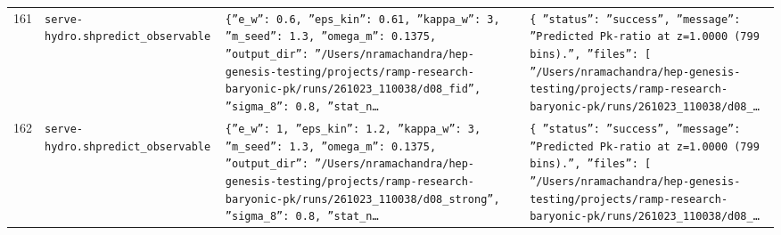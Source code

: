 \documentclass[11pt,a4paper]{article}
\begin{document}
\begin{longtable}{@{}p{}p{}p{}p{}@{}}
161 & \texttt{serve-hydro.sh}\newline\texttt{predict\_\allowbreak{}observable} & \texttt{\{''e\_\allowbreak{}w'':\allowbreak{} 0.6,\allowbreak{} ''eps\_\allowbreak{}kin'':\allowbreak{} 0.61,\allowbreak{} ''kappa\_\allowbreak{}w'':\allowbreak{} 3,\allowbreak{} ''m\_\allowbreak{}seed'':\allowbreak{} 1.3,\allowbreak{} ''omega\_\allowbreak{}m'':\allowbreak{} 0.1375,\allowbreak{} ''output\_\allowbreak{}dir'':\allowbreak{} ''/\allowbreak{}Users/\allowbreak{}nramachandra/\allowbreak{}hep-genesis-testing/\allowbreak{}projects/\allowbreak{}ramp-research-baryonic-pk/\allowbreak{}runs/\allowbreak{}261023\_\allowbreak{}110038/\allowbreak{}d08\_\allowbreak{}fid'',\allowbreak{} ''sigma\_\allowbreak{}8'':\allowbreak{} 0.8,\allowbreak{} ''stat\_\allowbreak{}n\ldots{}\allowbreak{}} & \texttt{\{   ''status'':\allowbreak{} ''success'',\allowbreak{}   ''message'':\allowbreak{} ''Predicted Pk-ratio at z=\allowbreak{}1.0000 (799 bins)\allowbreak{}.'',\allowbreak{}   ''files'':\allowbreak{} [     ''/\allowbreak{}Users/\allowbreak{}nramachandra/\allowbreak{}hep-genesis-testing/\allowbreak{}projects/\allowbreak{}ramp-research-baryonic-pk/\allowbreak{}runs/\allowbreak{}261023\_\allowbreak{}110038/\allowbreak{}d08\_\allowbreak{}\ldots{}\allowbreak{}} \\
162 & \texttt{serve-hydro.sh}\newline\texttt{predict\_\allowbreak{}observable} & \texttt{\{''e\_\allowbreak{}w'':\allowbreak{} 1,\allowbreak{} ''eps\_\allowbreak{}kin'':\allowbreak{} 1.2,\allowbreak{} ''kappa\_\allowbreak{}w'':\allowbreak{} 3,\allowbreak{} ''m\_\allowbreak{}seed'':\allowbreak{} 1.3,\allowbreak{} ''omega\_\allowbreak{}m'':\allowbreak{} 0.1375,\allowbreak{} ''output\_\allowbreak{}dir'':\allowbreak{} ''/\allowbreak{}Users/\allowbreak{}nramachandra/\allowbreak{}hep-genesis-testing/\allowbreak{}projects/\allowbreak{}ramp-research-baryonic-pk/\allowbreak{}runs/\allowbreak{}261023\_\allowbreak{}110038/\allowbreak{}d08\_\allowbreak{}strong'',\allowbreak{} ''sigma\_\allowbreak{}8'':\allowbreak{} 0.8,\allowbreak{} ''stat\_\allowbreak{}n\ldots{}\allowbreak{}} & \texttt{\{   ''status'':\allowbreak{} ''success'',\allowbreak{}   ''message'':\allowbreak{} ''Predicted Pk-ratio at z=\allowbreak{}1.0000 (799 bins)\allowbreak{}.'',\allowbreak{}   ''files'':\allowbreak{} [     ''/\allowbreak{}Users/\allowbreak{}nramachandra/\allowbreak{}hep-genesis-testing/\allowbreak{}projects/\allowbreak{}ramp-research-baryonic-pk/\allowbreak{}runs/\allowbreak{}261023\_\allowbreak{}110038/\allowbreak{}d08\_\allowbreak{}\ldots{}\allowbreak{}} \\

\end{longtable}
\end{document}
